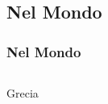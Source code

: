\documentclass{beamer}
\begin{document}
\subsection{Nel Mondo}
\begin{frame}\frametitle{Nel Mondo}
\begin{columns}
{\Large Grecia}
\begin{figure}{}\end{figure} 
\begin{figure}{}\end{figure} 
\end{columns}
\end{frame}
\end{document}
